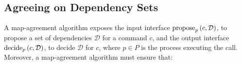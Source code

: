 


\subsection{Agreeing on Dependency Sets}
\label{map-algo}

A map-agreement algorithm exposes the input interface $\operatorname{propose}_p\left( c, \mathcal{D} \right)$, to propose a set of dependencies $\mathcal{D}$ for a command $c$, and the output interface $\operatorname{decide}_p\left( c, \mathcal{D} \right)$, to decide $\mathcal{D}$ for $c$, where $p\in P$ is the process executing the call.
Moreover, a map-agreement algorithm must ensure that: 
\begin{comment}
\begin{enumerate}[noitemsep,nolistsep]
    \item If the set of dependencies $\mathcal{D}$ is decided for a command $c$, then $\mathcal{D}$ has been proposed for $c$ at an earlier time.
    \item If $\mathcal{D}_1$ is decided for a command $c$ and $\mathcal{D}_2$ is decided for the same command $c$, then $\mathcal{D}_1$ is equal to $\mathcal{D}_2$.
 \end{enumerate}

\todo{OR MORE FORMALLY}

\end{comment}

